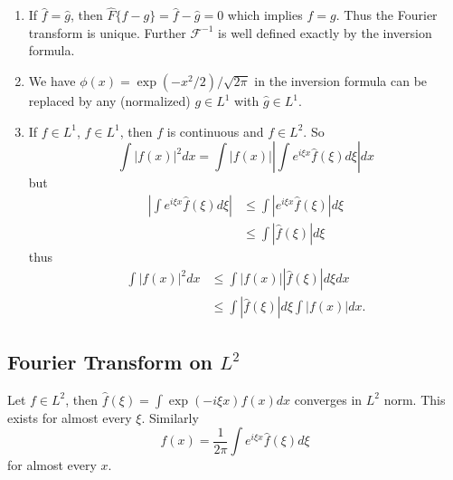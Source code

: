 \begin{enumerate}
\item If $\widehat{f}=\widehat{g}$, then
  $\widehat{F}\{f-g\}=\widehat{f}-\widehat{g}=0$ which
  implies $f=g$. Thus the Fourier transform is
  unique. Further
  $\mathcal{F}^{-1}$ is well defined exactly by the
  inversion formula.
\item We have $\phi(x) = \exp(-x^2/2)/\sqrt{2\pi}$ in the
  inversion formula can be replaced by any (normalized)
  $g\in L^1$ with $\widehat{g}\in L^1$.
\item If $f\in L^1$, $\widehat{f}\in L^1$, then $f$ is
  continuous and $f\in L^2$. So
\begin{equation}
\int |f(x)|^2dx = \int|f(x)|\left|\int e^{i\xi x}\widehat{f}(\xi)d\xi\right|dx
\end{equation}
but
\begin{align*}
\left|\int e^{i\xi x}\widehat{f}(\xi)d\xi\right| &\leq
\int\left|e^{i\xi x}\widehat{f}(\xi)\right|d\xi\\
&\leq\int|\widehat{f}(\xi)|d\xi
\end{align*}
thus
\begin{align*}
\int|f(x)|^2dx &\leq \int|f(x)||\widehat{f}(\xi)|d\xi dx\\
&\leq \int|\widehat{f}(\xi)|d\xi\int|f(x)|dx.
\end{align*}
\end{enumerate}

\subsection{Fourier Transform on $L^2$}

Let $f\in L^2$, then $\widehat{f}(\xi)=\int\exp(-i\xi
x)f(x)dx$ converges in $L^2$ norm. This exists for almost
every $\xi$. Similarly
\begin{equation}
f(x) = \frac{1}{2\pi}\int e^{i\xi x}\widehat{f}(\xi)d\xi
\end{equation}
for almost every $x$.

